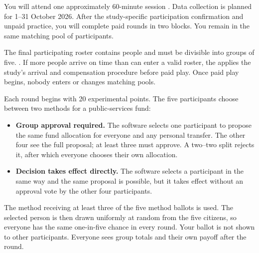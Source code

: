 You will attend one approximately 60-minute session .  Data collection is planned for 1--31 October 2026. After the study-specific participation confirmation and unpaid practice, you will complete  paid rounds in two blocks. You remain in the same matching pool of  participants.

The final participating roster contains  people and must be divisible into groups of five. . If more people arrive on time than can enter a valid roster, the  applies the study's arrival and compensation procedure before paid play. Once paid play begins, nobody enters or changes matching pools.

Each round begins with 20 experimental points. The five participants choose between two methods for a public-services fund:
\begin{itemize}
  \item \textbf{Group approval required.} The software selects one participant to propose the same fund allocation for everyone and any personal transfer. The other four see the full proposal; at least three must approve. A two--two split rejects it, after which everyone chooses their own allocation.
  \item \textbf{Decision takes effect directly.} The software selects a participant in the same way and the same proposal is possible, but it takes effect without an approval vote by the other four participants.
\end{itemize}
The method receiving at least three of the five method ballots is used. The selected person is then drawn uniformly at random from the five citizens, so everyone has the same one-in-five chance in every round. Your ballot is not shown to other participants. Everyone sees group totals and their own payoff after the round.


